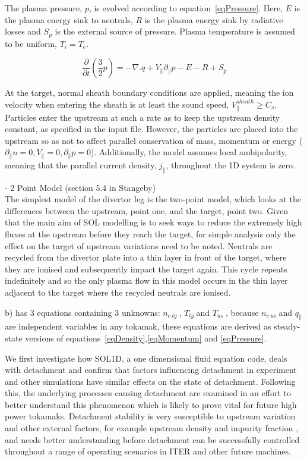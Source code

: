 \documentclass[12pt]{article}  %
\providecommand{\neus}{$n_{e~us}~$} %
\providecommand{\netg}{$n_{e~tg}~$} %
\providecommand{\Tus}{$T_{us}~$} %
\providecommand{\Ttg}{$T_{tg}~$} %
\begin{document}
The plasma pressure, $ p $, is evolved according to equation~\ref{eqPressure}. Here, $ E $ is the plasma energy sink to neutrals, $ R $ is the plasma energy sink by radiative losses and $ S_p $ is the external source of pressure. Plasma temperature is assumed to be uniform, $ T_i = T_e $.

\begin{equation}\label{eqPressure}
\frac{\partial}{\partial t}(\frac{3}{2}p) = -\nabla.q + V_{\parallel} \partial_{\parallel}p -E - R + S_p
\end{equation}


At the target, normal sheath boundary conditions are applied, meaning the ion velocity when entering the sheath is at least the sound speed, $ V_{\parallel}^{sheath} \geq C_s$. Particles enter the upstream at such a rate as to keep the upstream density constant, as specified in the input file. However, the particles are placed into the upstream so as not to affect parallel conservation of mass, momentum or energy ($ \partial_{\parallel}n =0, V_{\parallel} =0, \partial_{\parallel}p =0 $). Additionally, the model assumes local ambipolarity, meaning that the parallel current density, $j_{\parallel}$, throughout the 1D system is zero. 

- 2 Point Model (section 5.4 in Stangeby)\\
The simplest model of the divertor leg is the two-point model, which looks at the differences between the upstream, point one, and the target, point two. Given that the main aim of SOL modelling is to seek ways to reduce the extremely high fluxes at the upstream before they reach the target, for simple analysis only the effect on the target of upstream variations need to be noted. Neutrals are recycled from the divertor plate into a thin layer in front of the target, where they are ionised and subsequently impact the target again. This cycle repeats indefinitely and so the only plasma flow in this model occurs in the thin layer adjacent to the target where the recycled neutrals are ionised.

b) has 3 equations containing 3 unknowns: \netg, \Ttg and \Tus, because \neus and $q_{\parallel}$ are independent variables in any tokamak, these equations are derived as steady-state versions of equations~\ref{eqDensity},\ref{eqMomentum} and \ref{eqPressure}.




We first investigate how SOL1D, a one dimensional fluid equation code, deals with detachment and confirm that factors influencing detachment in experiment and other simulations have similar effects on the state of detachment. Following this, the underlying processes causing detachment are examined in an effort to better understand this phenomenon which is likely to prove vital for future high power tokamaks. Detachment stability is very susceptible to upstream variation and other external factors, for example upstream density and impurity fraction \cite{Lipschultz2016}, and needs better understanding before detachment can be successfully controlled throughout a range of operating scenarios in ITER and other future machines. 
\end{document}
